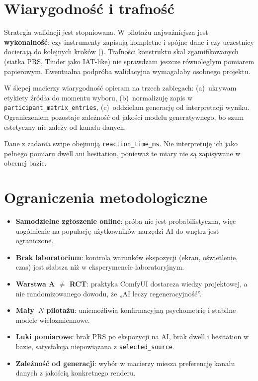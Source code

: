 \section{Wiarygodność i trafność}
\label{ch06:sec:trafnosc}

Strategia walidacji jest stopniowana. W pilotażu najważniejsza jest \textbf{wykonalność}: czy instrumenty zapisują kompletne i spójne dane i czy uczestnicy docierają do kolejnych kroków (). Trafności konstruktu skal zgamifikowanych (siatka PRS, Tinder jako IAT-like) nie sprawdzam jeszcze równoległym pomiarem papierowym. Ewentualna podpróba walidacyjna wymagałaby osobnego projektu.

W ślepej macierzy wiarygodność opieram na trzech zabiegach: (a)~ukrywam etykiety źródła do momentu wyboru, (b)~normalizuję zapis w \texttt{participant\_matrix\_entries}, (c)~oddzielam generację od interpretacji wyniku. Ograniczeniem pozostaje zależność od jakości modelu generatywnego, bo szum estetyczny nie zależy od kanału danych.

Dane z zadania swipe obejmują \texttt{reaction\_time\_ms}. Nie interpretuję ich jako pełnego pomiaru dwell ani hesitation, ponieważ te miary nie są zapisywane w obecnej bazie.

\section{Ograniczenia metodologiczne}
\label{ch06:sec:ograniczenia}

\begin{itemize}
  \item \textbf{Samodzielne zgłoszenie online}: próba nie jest probabilistyczna, więc uogólnienie na populację użytkowników narzędzi AI do wnętrz jest ograniczone.
  \item \textbf{Brak laboratorium}: kontrola warunków ekspozycji (ekran, oświetlenie, czas) jest słabsza niż w eksperymencie laboratoryjnym.
  \item \textbf{Warstwa A $\neq$ RCT}: praktyka ComfyUI dostarcza wiedzy projektowej, a nie randomizowanego dowodu, że „AI leczy regeneracyjność”.
  \item \textbf{Mały~$N$ pilotażu}: uniemożliwia konfirmacyjną psychometrię i stabilne modele wielozmiennowe.
  \item \textbf{Luki pomiarowe}: brak PRS po ekspozycji na AI, brak dwell i hesitation w bazie, satysfakcja niepowiązana z \texttt{selected\_source}.
  \item \textbf{Zależność od generacji}: wybór w macierzy miesza preferencję kanału danych z jakością konkretnego renderu.
\end{itemize}

